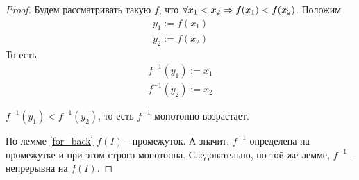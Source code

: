 \begin{proof}
	Будем рассматривать такую $f$, что $\forall x_1 < x_2 \Rightarrow f(x_1) < f(x_2)$. Положим
	\begin{align*}
		y_1 := f(x_1)
		\\
		y_2 := f(x_2)
	\end{align*}
	То есть
	\begin{align*}
		f^{-1}(y_1) := x_1
		\\
		f^{-1}(y_2) := x_2
	\end{align*}
	
	$f^{-1}(y_1) < f^{-1}(y_2)$, то есть $f^{-1}$ монотонно возрастает.
	
	По лемме \ref{for_back} $f(I)$ - промежуток. А значит, $f^{-1}$ определена на промежутке и при этом строго монотонна. Следовательно, по той же лемме, $f^{-1}$ - непрерывна на $f(I)$.
\end{proof}
